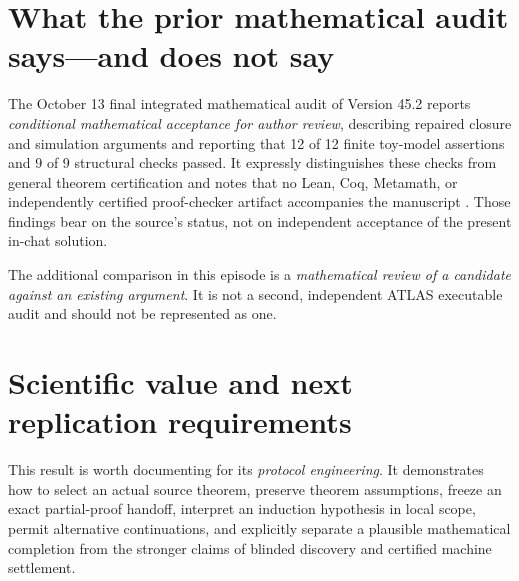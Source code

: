 \documentclass[11pt,letterpaper]{article}
\begin{document}
\section{What the prior mathematical audit says---and does not say}
The October 13 final integrated mathematical audit of Version 45.2 reports \emph{conditional mathematical acceptance for author review}, describing repaired closure and simulation arguments and reporting that 12 of 12 finite toy-model assertions and 9 of 9 structural checks passed. It expressly distinguishes these checks from general theorem certification and notes that no Lean, Coq, Metamath, or independently certified proof-checker artifact accompanies the manuscript \cite{audit}. Those findings bear on the source's status, not on independent acceptance of the present in-chat solution.

The additional comparison in this episode is a \emph{mathematical review of a candidate against an existing argument}. It is not a second, independent ATLAS executable audit and should not be represented as one.

\section{Scientific value and next replication requirements}
This result is worth documenting for its \emph{protocol engineering}. It demonstrates how to select an actual source theorem, preserve theorem assumptions, freeze an exact partial-proof handoff, interpret an induction hypothesis in local scope, permit alternative continuations, and explicitly separate a plausible mathematical completion from the stronger claims of blinded discovery and certified machine settlement.
\end{document}
